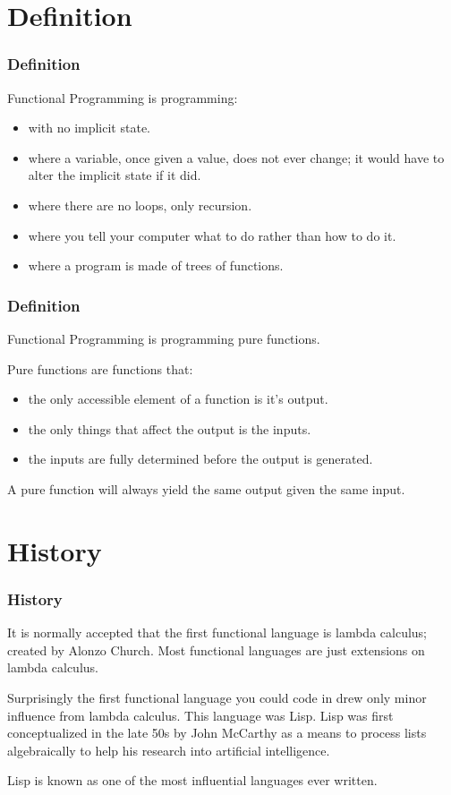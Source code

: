 \documentclass[presentation.tex]{subfiles}
\begin{document}
\section{Definition}
\begin{frame}
  \frametitle{Definition}
  Functional Programming is programming:
  \begin{itemize}
    \item with no implicit state.
    \item where a variable, once given a value, does not ever change; it would have to alter the implicit state if it did.
    \item where there are no loops, only recursion.
    \item where you tell your computer what to do rather than how to do it.
    \item where a program is made of trees of functions.
  \end{itemize}
\end{frame}


\begin{frame}
  \frametitle{Definition}
  Functional Programming is programming pure functions.

  \vspace{\baselineskip}
  Pure functions are functions that:
  \begin{itemize}
    \item the only accessible element of a function is it's output.
    \item the only things that affect the output is the inputs.
    \item the inputs are fully determined before the output is generated.
  \end{itemize}

  \vspace{\baselineskip}
  A pure function will always yield the same output given the same input.
\end{frame}


\section{History}
\begin{frame}
  \frametitle{History}
  It is normally accepted that the first functional language is lambda calculus; created by Alonzo Church. Most functional languages are just extensions on lambda calculus.

  \vspace{\baselineskip}
  Surprisingly the first functional language you could code in drew only minor influence from lambda calculus. This language was Lisp. Lisp was first conceptualized in the late 50s by John McCarthy as a means to process lists algebraically to help his research into artificial intelligence.

  \vspace{\baselineskip}
  Lisp is known as one of the most influential languages ever written.
\end{frame}
\end{document}
